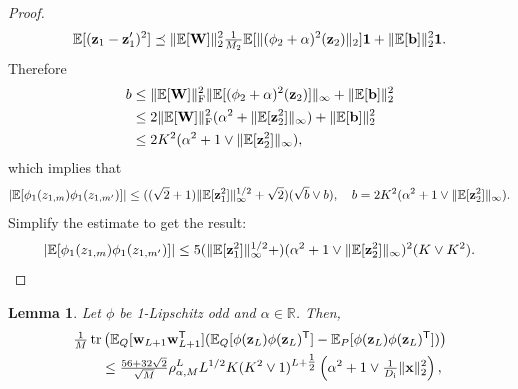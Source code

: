 \documentclass[twoside]{article}
\renewcommand{\ss}[1]{_{\text{#1}}}
\newcommand{\vb}{\mathbf{b}}
\newcommand{\vw}{\mathbf{w}}
\newcommand{\vx}{\mathbf{x}}
\newcommand{\vz}{\mathbf{z}}
\newcommand{\vone}{\mathbf{1}}
\newcommand{\mW}{\mathbf{W}}
\newcommand{\E}{\mathbb{E}}
\newcommand{\T}{\text{\textsf{T}}}
\newcommand{\opspace}{}
\newcommand{\tr}{\operatorname{tr}\opspace}
\renewcommand{\ss}[1]{_{\text{#1}}}        %
\DeclarePairedDelimiter\norm{\|}{\|}             %
\DeclarePairedDelimiter\abs{|}{|}                %
\theoremstyle{theoremstyle}
\newtheorem{lemma}[theorem]{Lemma}
\begin{document}
\begin{proof}
    \begin{equation}
        \E[(\vz_1 - \vz_1')^2]
        \preceq \norm{\E[\mW]}_2^2 \tfrac{1}{M_2}\E[ \norm{(\phi_2 + \alpha)^2(\vz_2)}_2 ] \vone + \norm{\E[\vb]}_2^2 \vone.
    \end{equation}
    Therefore
    \begin{align}
        b
        &\le \norm{\E[\mW]}\ss{F}^2 \norm{\E[(\phi_2 + \alpha)^2(\vz_2)]}_\infty + \norm{\E[\vb]}_2^2 \\
        &\le 2\norm{\E[\mW]}\ss{F}^2 (\alpha^2 + \norm{\E[\vz_2^2]}_\infty) + \norm{\E[\vb]}_2^2 \\
        &\le 2 K^2 (\alpha^2 + 1 \lor \norm{\E[\vz_2^2]}_\infty),
    \end{align}
    which implies that
    \begin{equation}
        \abs{\E[\phi_1(z_{1,m}) \phi_1(z_{1,m'})]}
        \le
            (
                (\sqrt{2}+1) \norm{\E[\vz_1^2]}_\infty^{1/2}
                + \sqrt{2}
            )(\sqrt{b} \lor b),
        \quad
        b = 2 K^2 (\alpha^2 + 1 \lor \norm{ \E[\vz_2^2] }_\infty).
    \end{equation}
    Simplify the estimate to get the result:
    \begin{equation}
        \abs{\E[\phi_1(z_{1,m}) \phi_1(z_{1,m'})]}
        \le
            5(
                \norm{\E[\vz_1^2]}_\infty^{1/2}
                + 
            )(\alpha^2 + 1 \lor \norm{ \E[\vz_2^2] }_\infty)^2(K \lor K^2).
    \end{equation}
\end{proof}


\begin{lemma} \label{lem:second_moment_conditional_prior}
Let $\phi$ be 1-Lipschitz odd and $\alpha\in \mathbb{R}$. Then, 
\begin{align}
    &\tfrac1M\tr \left( \E_{Q}[\vw_{L+1} \vw_{L+1}^\T] (
            \E_{Q}[\phi(\vz_L) \phi(\vz_L)^\T]
            - \E_{P}[\phi(\vz_L) \phi(\vz_L)^\T]
        ) \right)  \nonumber \\
    &\qquad \le
        \tfrac{56 + 32\sqrt{2}}{\sqrt{M}} \rho_{\alpha, M}^{L} L^{1/2} K (K^2 \lor 1)^{L+\tfrac12}\left(\alpha^2 + 1\lor \tfrac1{D\ss{i}}\|\vx\|^2_2\right),
\end{align}
\end{lemma}
\end{document}
